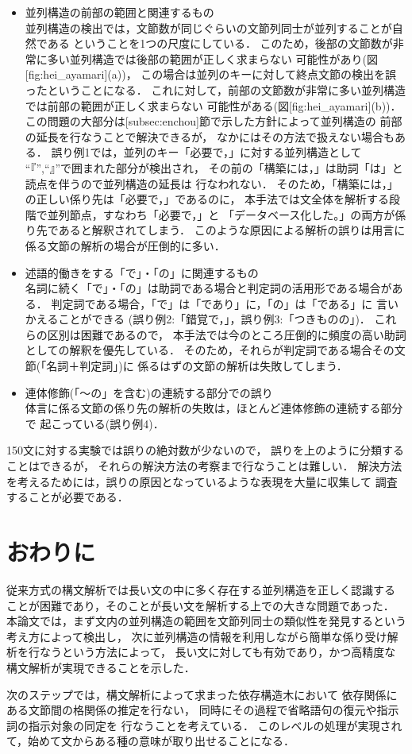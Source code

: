 \begin{itemize}
  \item 
並列構造の前部の範囲と関連するもの \\
並列構造の検出では，文節数が同じぐらいの文節列同士が並列することが自然である
ということを1つの尺度にしている．
このため，後部の文節数が非常に多い並列構造では後部の範囲が正しく求まらない
可能性があり(図[fig:hei_ayamari](a))，
この場合は並列のキーに対して終点文節の検出を誤ったということになる．
これに対して，前部の文節数が非常に多い並列構造では前部の範囲が正しく求まらない
可能性がある(図[fig:hei_ayamari](b))．
この問題の大部分は[subsec:enchou]節で示した方針によって並列構造の
前部の延長を行なうことで解決できるが，
なかにはその方法で扱えない場合もある．
誤り例1では，並列のキー「必要で，」に対する並列構造として
``『'',``』''で囲まれた部分が検出され，
その前の「構築には，」は助詞「は」と読点を伴うので並列構造の延長は
行なわれない．
そのため，「構築には，」の正しい係り先は「必要で，」であるのに，
本手法では文全体を解析する段階で並列節点，すなわち「必要で，」と
「データベース化した。」の両方が係り先であると解釈されてしまう．
このような原因による解析の誤りは用言に係る文節の解析の場合が圧倒的に多い．
  \item 
述語的働きをする「で」・「の」に関連するもの \\
名詞に続く「で」・「の」は助詞である場合と判定詞の活用形である場合がある．
判定詞である場合，「で」は「であり」に，「の」は「である」に
言いかえることができる
(誤り例2:「錯覚で，」，誤り例3:「つきものの」)．
これらの区別は困難であるので，
本手法では今のところ圧倒的に頻度の高い助詞としての解釈を優先している．
そのため，それらが判定詞である場合その文節(「名詞＋判定詞」)に
係るはずの文節の解析は失敗してしまう．
  \item 
連体修飾(「〜の」を含む)の連続する部分での誤り \\
体言に係る文節の係り先の解析の失敗は，ほとんど連体修飾の連続する部分で
起こっている(誤り例4)．
\end{itemize}

150文に対する実験では誤りの絶対数が少ないので，
誤りを上のように分類することはできるが，
それらの解決方法の考察まで行なうことは難しい．
解決方法を考えるためには，誤りの原因となっているような表現を大量に収集して
調査することが必要である．

\section{おわりに}

従来方式の構文解析では長い文の中に多く存在する並列構造を正しく認識する
ことが困難であり，そのことが長い文を解析する上での大きな問題であった．
本論文では，まず文内の並列構造の範囲を文節列同士の類似性を発見するという
考え方によって検出し，
次に並列構造の情報を利用しながら簡単な係り受け解析を行なうという方法によって，
長い文に対しても有効であり，かつ高精度な構文解析が実現できることを示した．

次のステップでは，構文解析によって求まった依存構造木において
依存関係にある文節間の格関係の推定を行ない，
同時にその過程で省略語句の復元や指示詞の指示対象の同定を
行なうことを考えている．
このレベルの処理が実現されて，始めて文からある種の意味が取り出せることになる．


